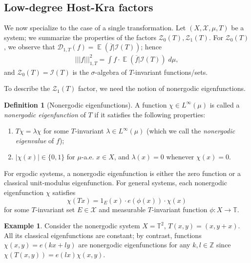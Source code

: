 \documentclass[11pt]{amsart}
\theoremstyle{definition}
\newtheorem{definition}[lemma]{Definition}
\newtheorem{example}[lemma]{Example}
\DeclareMathOperator*{\E}{\mathbb{E}}
\newcommand{\C}{{\mathbb C}}
\newcommand{\T}{{\mathbb T}}
\newcommand{\Z}{{\mathbb Z}}
\newcommand{\CD}{{\mathcal D}}
\newcommand{\CE}{{\mathcal E}}
\newcommand{\CI}{{\mathcal I}}
\newcommand{\CX}{{\mathcal X}}
\newcommand{\CZ}{{\mathcal Z}}
\newcommand{\bh}{{\mathbf{h}}}
\newcommand{\nnorm}[1]{\lvert\!|\!| #1|\!|\!\rvert}
\newcommand{\1}{{\mathbf{1}}}
\begin{document}
\subsection{Low-degree Host-Kra factors}\label{A: low-degree HK factors}
We now specialize to the case of a single transformation. Let $(X, \CX, \mu, T)$ be a system; we summarize the properties of the factors $\CZ_0(T), \CZ_1(T)$.
For $\CZ_0(T)$, we observe that $\CD_{1,T}(f) = \E(\overline f|\CI(T))$; hence
\begin{align}\label{E: deg 1 inverse theorem}
    \nnorm{f}_{1,T}^2 = \int f \cdot \E(\overline f|\CI(T))\; d\mu,
\end{align}
and $\CZ_0(T) = \CI(T)$
is the $\sigma$-algebra of $T$-invariant functions/sets. %

To describe the $\CZ_1(T)$ factor, we need the notion of nonergodic eigenfunctions. %

\begin{definition}[Nonergodic eigenfunctions]
A function $\chi\in L^\infty(\mu)$ is called a \emph{nonergodic eigenfunction} of $T$ if it satisfies the following properties:
    \begin{enumerate}
        \item $T\chi = \lambda \chi$ for some $T$-invariant $\lambda\in L^\infty(\mu)$ (which we call the \emph{nonergodic eigenvalue} of $f$);
        \item $|\chi(x)|\in\{0,1\}$ for $\mu$-a.e. $x\in X$, and $\lambda(x)=0$ whenever $\chi(x)=0$.
\end{enumerate}
\end{definition}

		 For ergodic systems, a nonergodic eigenfunction is either the zero function or a classical unit-modulus eigenfunction. For general systems, each nonergodic eigenfunction $\chi$ satisfies
		 \begin{equation*}%
		 	\chi(Tx)=1_E(x) \cdot e(\phi(x))\cdot \chi(x)
		 \end{equation*}
		  for some $T$-invariant set $E\in \CX$ and measurable $T$-invariant function $\phi \colon X\to \T$. 
          \begin{example}
              Consider the nonergodic system $X = \T^2$, $T(x,y) = (x, y+x)$. All its classical eigenfunctions are constant; by contrast, functions $\chi(x,y) = e(kx+ly)$ are nonergodic eigenfunctions for any $k,l\in\Z$ since $\chi(T(x,y)) = e(lx)\chi(x,y)$.
          \end{example}
          
\end{document}
